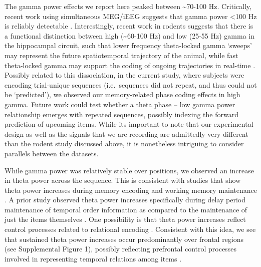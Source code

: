 The gamma power effects we report here peaked between
\textasciitilde{}70-100 Hz. Critically, recent work using simultaneous
MEG/iEEG suggests that gamma power \textless{}100 Hz is reliably
detectable \autocite{dalal_simultaneous_2013}. Interestingly, recent
work in rodents suggests that there is a functional distinction between
high (\textasciitilde{}60-100 Hz) and low (25-55 Hz) gamma in the
hippocampal circuit, such that lower frequency theta-locked gamma
`sweeps' may represent the future spatiotemporal trajectory of the
animal, while fast theta-locked gamma may support the coding of ongoing
trajectories in real-time \autocite{zheng_spatial_2016}. Possibly
related to this dissociation, in the current study, where subjects were
encoding trial-unique sequences (i.e.~sequences did not repeat, and thus
could not be `predicted'), we observed our memory-related phase coding
effects in high gamma. Future work could test whether a theta phase --
low gamma power relationship emerges with repeated sequences, possibly
indexing the forward prediction of upcoming items. While its important
to note that our experimental design as well as the signals that we are
recording are admittedly very different than the rodent study discussed
above, it is nonetheless intriguing to consider parallels between the
datasets.

While gamma power was relatively stable over positions, we observed an
increase in theta power across the sequence. This is consistent with
studies that show theta power increases during memory encoding
\autocites{summerfield_coherent_2005}{sederberg_theta_2003} and working
memory maintenance
\autocites{hsieh_neural_2011}{gevins_high-resolution_1997}{raghavachari_gating_2001}{scheeringa_trial-by-trial_2009}.
A prior study observed theta power increases specifically during delay
period maintenance of temporal order information as compared to the
maintenance of just the items themselves \autocite{hsieh_neural_2011}.
One possibility is that theta power increases reflect control processes
related to relational encoding
\autocites{hsieh_neural_2011}{summerfield_coherent_2005}. Consistent
with this idea, we see that sustained theta power increases occur
predominantly over frontal regions (see Supplemental Figure 1), possibly
reflecting prefrontal control processes involved in representing
temporal relations among items \autocite{blumenfeld_putting_2011}.

